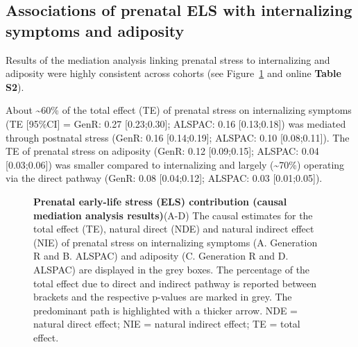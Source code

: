 \documentclass[
  letterpaper,
  DIV=11,
  numbers=noendperiod]{scrreport}
\begin{document}
\subsection{Associations of prenatal ELS with internalizing symptoms and
adiposity}\label{associations-of-prenatal-els-with-internalizing-symptoms-and-adiposity}

Results of the mediation analysis linking prenatal stress to
internalizing and adiposity were highly consistent across cohorts (see
Figure~\ref{fig-1.2} and online \textbf{Table S2}).

About \textasciitilde60\% of the total effect (TE) of prenatal stress on
internalizing symptoms (TE {[}95\%CI{]} = GenR: 0.27 {[}0.23;0.30{]};
ALSPAC: 0.16 {[}0.13;0.18{]}) was mediated through postnatal stress
(GenR: 0.16 {[}0.14;0.19{]}; ALSPAC: 0.10 {[}0.08;0.11{]}). The TE of
prenatal stress on adiposity (GenR: 0.12 {[}0.09;0.15{]}; ALSPAC: 0.04
{[}0.03;0.06{]}) was smaller compared to internalizing and largely
(\textasciitilde70\%) operating via the direct pathway (GenR: 0.08
{[}0.04;0.12{]}; ALSPAC: 0.03 {[}0.01;0.05{]}).

\begin{figure}[H]


\caption{\label{fig-1.2}\textbf{Prenatal early-life stress (ELS)
contribution (causal mediation analysis results)}\newline(A-D) The
causal estimates for the total effect (TE), natural direct (NDE) and
natural indirect effect (NIE) of prenatal stress on internalizing
symptoms (A. Generation R and B. ALSPAC) and adiposity (C. Generation R
and D. ALSPAC) are displayed in the grey boxes. The percentage of the
total effect due to direct and indirect pathway is reported between
brackets and the respective p-values are marked in grey. The predominant
path is highlighted with a thicker arrow. NDE = natural direct effect;
NIE = natural indirect effect; TE = total effect.}

\end{figure}%
\end{document}
